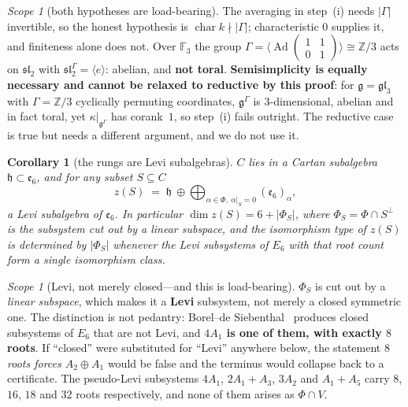 \documentclass[11pt,reqno]{amsart}
\theoremstyle{plain}
\newtheorem{corollary}[theorem]{Corollary}
\theoremstyle{definition}
\theoremstyle{remark}
\newtheorem{scope}[theorem]{Scope}
\newcommand{\Z}{\mathbb{Z}}
\newcommand{\sll}{\mathfrak{sl}}
\newcommand{\ee}{\mathfrak{e}}
\newcommand{\Ad}{\operatorname{Ad}}
\newcommand{\g}{\mathfrak{g}}
\newcommand{\h}{\mathfrak{h}}
\begin{document}
\begin{scope}[both hypotheses are load-bearing]\label{sc:toralscope}
The averaging in step~(i) needs $\lvert\Gamma\rvert$ invertible, so the honest hypothesis
is $\operatorname{char}k\nmid\lvert\Gamma\rvert$; characteristic $0$ supplies it, and
finiteness alone does not. Over $\mathbb F_3$ the group $\Gamma=\langle
\Ad\left(\begin{smallmatrix}1&1\\0&1\end{smallmatrix}\right)\rangle\cong\Z/3$ acts on
$\sll_2$ with $\sll_2^\Gamma=\langle e\rangle$: abelian, and \textbf{not toral}.
\textbf{Semisimplicity is equally necessary and cannot be relaxed to reductive by this
proof}: for $\g=\mathfrak{gl}_3$ with $\Gamma=\Z/3$ cyclically permuting coordinates,
$\g^\Gamma$ is $3$-dimensional, abelian and in fact toral, yet $\kappa|_{\g^\Gamma}$ has
corank~$1$, so step~(i) fails outright. The reductive case is true but needs a different
argument, and we do not use it.
\end{scope}

\begin{corollary}[the rungs are Levi subalgebras]\label{cor:levi}
$C$ lies in a Cartan subalgebra $\h\subset\ee_6$, and for any subset $S\subseteq C$
\[
   z(S)\;=\;\h\ \oplus\!\!\bigoplus_{\alpha\in\Phi,\ \alpha|_S=0}\!\!(\ee_6)_\alpha ,
\]
a Levi subalgebra of $\ee_6$. In particular $\dim z(S)=6+\lvert\Phi_S\rvert$, where
$\Phi_S=\Phi\cap S^{\perp}$ is the subsystem cut out by a linear subspace, and the
isomorphism type of $z(S)$ is determined by $\lvert\Phi_S\rvert$ whenever the Levi
subsystems of $E_6$ with that root count form a single isomorphism class.
\end{corollary}

\begin{scope}[Levi, not merely closed---and this is load-bearing]\label{sc:pseudolevi}
$\Phi_S$ is cut out by a \emph{linear subspace}, which makes it a \textbf{Levi}
subsystem, not merely a closed symmetric one. The distinction is not pedantry:
Borel--de Siebenthal~\cite{BdS} produces closed subsystems of $E_6$ that are not Levi, and
\textbf{$4A_1$ is one of them, with exactly $8$ roots}. If ``closed'' were substituted for
``Levi'' anywhere below, the statement \emph{$8$ roots forces $A_2\oplus A_1$} would be
false and the terminus would collapse back to a certificate. The pseudo-Levi subsystems
$4A_1$, $2A_1{+}A_3$, $3A_2$ and $A_1{+}A_5$ carry $8$, $16$, $18$ and $32$ roots
respectively, and none of them arises as $\Phi\cap V$.
\end{scope}
\end{document}
